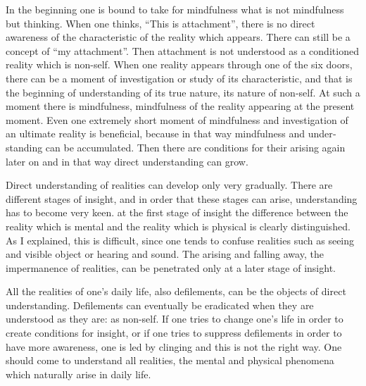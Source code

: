\documentclass{book}
\begin{document}
In the beginning one is bound to take for mindfulness what is not
mindfulness but thinking. When one thinks, ``This is attachment'', there
is no direct awareness of the characteristic of the reality which
appears. There can still be a concept of ``my attachment''. Then
attachment is not understood as a conditioned reality which is non-self.
When one reality appears through one of the six doors, there can be a
moment of investigation or study of its characteristic, and that is the
beginning of understanding of its true nature, its nature of non-self.
At such a moment there is mindfulness, mindfulness of the reality
appearing at the present moment. Even one extremely short moment of
mindfulness and investigation of an ultimate reality is beneficial,
because in that way mindfulness and under­standing can be accumulated.
Then there are conditions for their arising again later on and in that
way direct understanding can grow.

Direct understanding of realities can develop only very gradually. 
There are different stages of insight, and in order that these stages    can arise, understanding has to become very keen. at the first stage      of insight the difference between the reality which is mental and the reality which is physical is clearly distinguished. As I explained,     this is difficult, since one tends to confuse realities such as seeing   and visible object or hearing and sound. The arising and falling away,   the impermanence of realities, can be penetrated only at a later stage    of insight.

All the realities of one's daily life, also defilements, can be the
objects of direct understanding. Defilements can eventually be
eradicated when they are understood as they are: as non-self. If one
tries to change one's life in order to create conditions for insight, or
if one tries to suppress defilements in order to have more awareness,
one is led by clinging and this is not the right way. One should come to
understand all realities, the mental and physical phenomena which
naturally arise in daily life.
\end{document}
